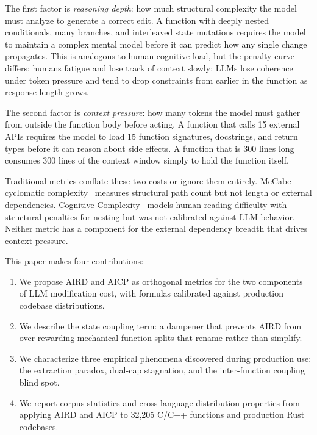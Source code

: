 \documentclass[10pt,twocolumn,letterpaper]{article}
\begin{document}
The first factor is \emph{reasoning depth}: how much structural complexity
the model must analyze to generate a correct edit.  A function with
deeply nested conditionals, many branches, and interleaved state
mutations requires the model to maintain a complex mental model before it
can predict how any single change propagates.  This is analogous to
human cognitive load, but the penalty curve differs: humans fatigue and
lose track of context slowly; LLMs lose coherence under token pressure
and tend to drop constraints from earlier in the function as response
length grows.

The second factor is \emph{context pressure}: how many tokens the model
must gather from outside the function body before acting.  A function
that calls 15 external APIs requires the model to load 15 function
signatures, docstrings, and return types before it can reason about side
effects.  A function that is 300 lines long consumes 300 lines of the
context window simply to hold the function itself.

Traditional metrics conflate these two costs or ignore them entirely.
McCabe cyclomatic complexity~\cite{mccabe} measures structural path count
but not length or external dependencies.  Cognitive Complexity~\cite{cognitive-complexity}
models human reading difficulty with structural penalties for nesting but
was not calibrated against LLM behavior.  Neither metric has a component
for the external dependency breadth that drives context pressure.

This paper makes four contributions:

\begin{enumerate}
    \item We propose AIRD and AICP as orthogonal metrics for the two
        components of LLM modification cost, with formulas calibrated
        against production codebase distributions.
    \item We describe the state coupling term: a dampener that prevents
        AIRD from over-rewarding mechanical function splits that rename
        rather than simplify.
    \item We characterize three empirical phenomena discovered during
        production use: the extraction paradox, dual-cap stagnation, and
        the inter-function coupling blind spot.
    \item We report corpus statistics and cross-language distribution
        properties from applying AIRD and AICP to 32,205 C/C++ functions
        and production Rust codebases.
\end{enumerate}
\end{document}
